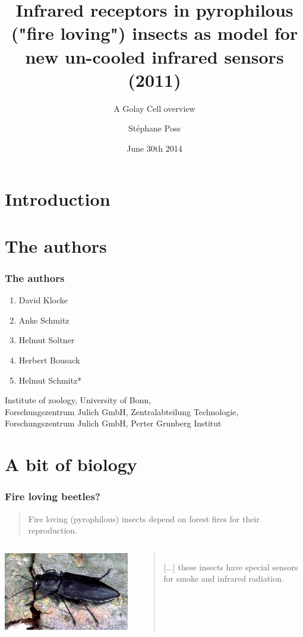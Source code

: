 \documentclass[14pt]{beamer}
\title{Infrared receptors in pyrophilous\\ ("fire loving") insects as model for new un-cooled infrared sensors (2011)}
\subtitle{A Golay Cell overview}
\author{St\'ephane Poss}
\date{June 30th 2014}
\begin{document}
\begin{frame}[plain]
\titlepage
\end{frame}

\section{Introduction}

\begin{frame}
\tableofcontents
\end{frame}

\section{The authors}
\begin{frame}
\frametitle{The authors}
\begin{enumerate}
\item David Klocke
\item Anke Schmitz
\item Helmut Soltner
\item Herbert Bousack
\item Helmut Schmitz*
\end{enumerate}
Institute of zoology, University of Bonn,\\
Forschungszentrum Julich GmbH, Zentralabteilung Technologie,\\
Forschungszentrum Julich GmbH, Perter Grunberg Institut
\end{frame}

\section{A bit of biology}
\begin{frame}
\frametitle{Fire loving beetles?}
\begin{quote}
Fire loving (pyrophilous) insects depend on forest fires for their reproduction.
\end{quote}
\begin{columns}
\includegraphics[width=\textwidth]{kaefer_03.jpg}
\begin{quote}
[...] these insects have special sensors for smoke and infrared radiation.
\end{quote}
\end{columns}
\end{frame}
\end{document}
